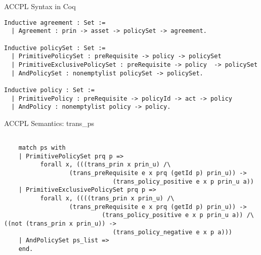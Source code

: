 \documentclass{beamer}
\begin{document}
\begin{frame}[fragile]{ACCPL Syntax in Coq}
\lstset{language=Coq}
\begin{lstlisting}
Inductive agreement : Set :=
  | Agreement : prin -> asset -> policySet -> agreement.

Inductive policySet : Set :=
  | PrimitivePolicySet : preRequisite -> policy -> policySet 
  | PrimitiveExclusivePolicySet : preRequisite -> policy  -> policySet 
  | AndPolicySet : nonemptylist policySet -> policySet.

Inductive policy : Set :=
  | PrimitivePolicy : preRequisite -> policyId -> act -> policy 
  | AndPolicy : nonemptylist policy -> policy.

\end{lstlisting}
\end{frame}
\begin{frame}[fragile]{ACCPL Semantics: trans\_ps}
\lstset{language=Coq}
\begin{lstlisting}

    match ps with
    | PrimitivePolicySet prq p => 
          forall x, (((trans_prin x prin_u) /\ 
                  (trans_preRequisite e x prq (getId p) prin_u)) -> 
                              (trans_policy_positive e x p prin_u a))  
    | PrimitiveExclusivePolicySet prq p => 
          forall x, ((((trans_prin x prin_u) /\ 
                  (trans_preRequisite e x prq (getId p) prin_u)) -> 
                           (trans_policy_positive e x p prin_u a)) /\ ((not (trans_prin x prin_u)) -> 
                              (trans_policy_negative e x p a)))                  
    | AndPolicySet ps_list => 
    end.
\end{lstlisting}
\end{frame}
\end{document}
